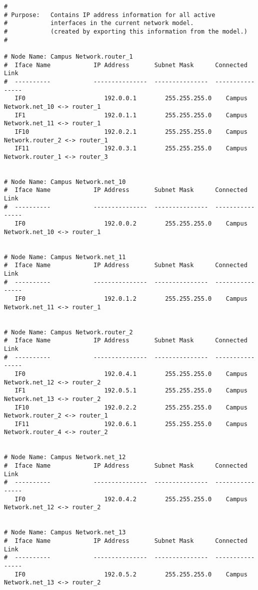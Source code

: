 \documentclass[a4paper]{article}
\begin{document}
\begin{lstlisting}
# 
# Purpose:   Contains IP address information for all active 
#            interfaces in the current network model.
#            (created by exporting this information from the model.)
# 

# Node Name: Campus Network.router_1
#  Iface Name            IP Address       Subnet Mask      Connected Link
#  ----------            ---------------  ---------------  ----------------
   IF0                      192.0.0.1        255.255.255.0    Campus Network.net_10 <-> router_1
   IF1                      192.0.1.1        255.255.255.0    Campus Network.net_11 <-> router_1
   IF10                     192.0.2.1        255.255.255.0    Campus Network.router_2 <-> router_1
   IF11                     192.0.3.1        255.255.255.0    Campus Network.router_1 <-> router_3


# Node Name: Campus Network.net_10
#  Iface Name            IP Address       Subnet Mask      Connected Link
#  ----------            ---------------  ---------------  ----------------
   IF0                      192.0.0.2        255.255.255.0    Campus Network.net_10 <-> router_1


# Node Name: Campus Network.net_11
#  Iface Name            IP Address       Subnet Mask      Connected Link
#  ----------            ---------------  ---------------  ----------------
   IF0                      192.0.1.2        255.255.255.0    Campus Network.net_11 <-> router_1


# Node Name: Campus Network.router_2
#  Iface Name            IP Address       Subnet Mask      Connected Link
#  ----------            ---------------  ---------------  ----------------
   IF0                      192.0.4.1        255.255.255.0    Campus Network.net_12 <-> router_2
   IF1                      192.0.5.1        255.255.255.0    Campus Network.net_13 <-> router_2
   IF10                     192.0.2.2        255.255.255.0    Campus Network.router_2 <-> router_1
   IF11                     192.0.6.1        255.255.255.0    Campus Network.router_4 <-> router_2


# Node Name: Campus Network.net_12
#  Iface Name            IP Address       Subnet Mask      Connected Link
#  ----------            ---------------  ---------------  ----------------
   IF0                      192.0.4.2        255.255.255.0    Campus Network.net_12 <-> router_2


# Node Name: Campus Network.net_13
#  Iface Name            IP Address       Subnet Mask      Connected Link
#  ----------            ---------------  ---------------  ----------------
   IF0                      192.0.5.2        255.255.255.0    Campus Network.net_13 <-> router_2



\end{lstlisting}
\end{document}
